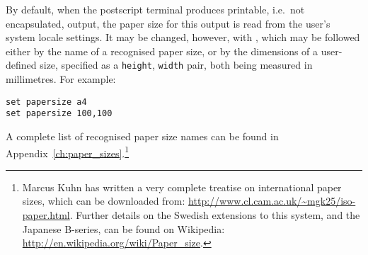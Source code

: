 By default, when the postscript terminal produces printable, i.e.\ not
encapsulated, output, the paper size for this output is read from the user's
system locale settings. It may be changed, however, with , which may be followed either by the name of a recognised paper
size, or by the dimensions of a user-defined size, specified as a {\tt height},
{\tt width} pair, both being measured in millimetres. For example:

\begin{verbatim}
set papersize a4
set papersize 100,100
\end{verbatim}

\noindent A complete list of recognised paper size names can be found in
Appendix~\ref{ch:paper_sizes}.\footnote{Marcus Kuhn has written a very complete
treatise on international paper sizes, which can be downloaded from:
\url{http://www.cl.cam.ac.uk/~mgk25/iso-paper.html}. Further details on the
Swedish extensions to this system, and the Japanese B-series, can be found on
Wikipedia: \url{http://en.wikipedia.org/wiki/Paper_size}.}

